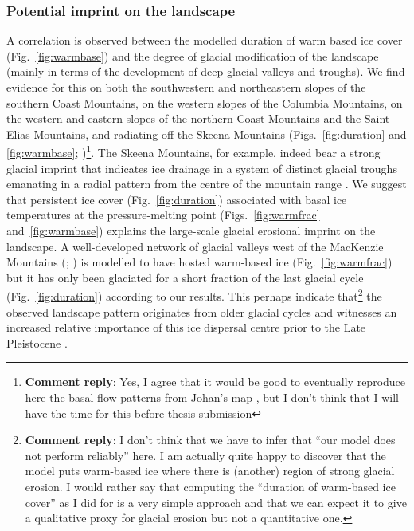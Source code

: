 \documentclass[tc, manuscript]{copernicus}
\newcommand{\renote}[1]{\footnote{\textbf{Comment reply}: #1}}
\begin{document}
\subsubsection{Potential imprint on the landscape}

A correlation is observed between the modelled duration of warm based ice cover
(Fig.~\ref{fig:warmbase}) and the degree of glacial modification of the
landscape (mainly in terms of the development of deep glacial valleys and
troughs). We find evidence for this on both the southwestern and northeastern
slopes of the southern Coast Mountains, on the western slopes of the Columbia
Mountains, on the western and eastern slopes of the northern Coast Mountains
and the Saint-Elias Mountains, and radiating off the Skeena Mountains
(Figs.~\ref{fig:duration} and \ref{fig:warmbase};
\citealp[Fig.~2]{Kleman.etal.2010})\renote{
    Yes, I agree that it would be good to eventually reproduce here the basal
    flow patterns from Johan's map \citep[Fig.~2]{Kleman.etal.2010}, but I
    don't think that I will have the time for this before thesis submission}.
The Skeena Mountains, for example, indeed bear a strong glacial imprint that
indicates ice drainage in a system of distinct glacial troughs emanating in a
radial pattern from the centre of the mountain range
\citep[Fig.~2]{Kleman.etal.2010}. We suggest that
persistent ice cover (Fig.~\ref{fig:duration}) associated with basal ice
temperatures at the pressure-melting point (Figs.~\ref{fig:warmfrac}
and~\ref{fig:warmbase}) explains the large-scale glacial erosional imprint on
the landscape. A well-developed network of glacial valleys west of
the MacKenzie Mountains (\citealp[Fig.~2]{Kleman.etal.2010}; \citealp[Fig.~8]
{Stroeven.etal.2010}) is modelled to have hosted warm-based ice
(Fig.~\ref{fig:warmfrac}) but it has only been glaciated for a short fraction
of the last glacial cycle (Fig.~\ref{fig:duration}) according to our
results. This perhaps indicate that\renote{
    I don't think that we have to infer that ``our model does not perform
    reliably'' here. I am actually quite happy to discover that the model
    puts warm-based ice where there is (another) region of strong glacial
    erosion. I would rather say that computing the ``duration of
    warm-based ice cover'' as I did for is a very simple approach and that we
    can expect it to give a qualitative proxy for glacial erosion but not a
    quantitative one.}
the observed landscape pattern originates from older glacial cycles and
witnesses an increased relative importance of this ice dispersal centre prior
to the Late Pleistocene \citep[cf.][]{Ward.etal.2008, Demuro.etal.2012}.
\end{document}
